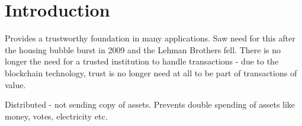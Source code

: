 \chapter{Introduction}




Provides a trustworthy foundation in many applications. Saw need for this after the housing bubble burst in 2009 and the Lehman Brothers fell. There is no longer the need for a trusted institution to handle transactions - due to the blockchain technology, trust is no longer need at all to be part of transactions of value.

Distributed - not sending copy of assets. Prevents double spending of assets like money, votes, electricity etc. 

